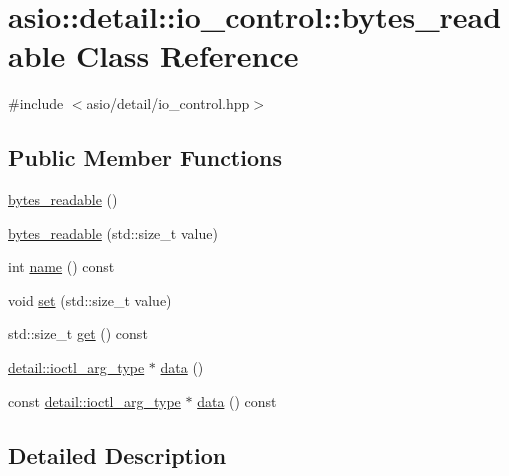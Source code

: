 \hypertarget{classasio_1_1detail_1_1io__control_1_1bytes__readable}{}\section{asio\+:\+:detail\+:\+:io\+\_\+control\+:\+:bytes\+\_\+readable Class Reference}
\label{classasio_1_1detail_1_1io__control_1_1bytes__readable}


{\ttfamily \#include $<$asio/detail/io\+\_\+control.\+hpp$>$}

\subsection*{Public Member Functions}
\begin{DoxyCompactItemize}
\item 
\hyperlink{classasio_1_1detail_1_1io__control_1_1bytes__readable_ab6570cf3dde553e8235764e7ddb3bedd}{bytes\+\_\+readable} ()
\item 
\hyperlink{classasio_1_1detail_1_1io__control_1_1bytes__readable_a2aef63faf74cd5450291c32f00def2e4}{bytes\+\_\+readable} (std\+::size\+\_\+t value)
\item 
int \hyperlink{classasio_1_1detail_1_1io__control_1_1bytes__readable_a20044117f07f99b67b0daa9c04aaf74b}{name} () const 
\item 
void \hyperlink{classasio_1_1detail_1_1io__control_1_1bytes__readable_a90fc57f95e23a2959eef843f9c20cd33}{set} (std\+::size\+\_\+t value)
\item 
std\+::size\+\_\+t \hyperlink{classasio_1_1detail_1_1io__control_1_1bytes__readable_aa6b38448b5daa5b6dd03f9c3c9a1cb08}{get} () const 
\item 
\hyperlink{namespaceasio_1_1detail_a27f72e1b8b785eaaa59ddc6b41751106}{detail\+::ioctl\+\_\+arg\+\_\+type} $\ast$ \hyperlink{classasio_1_1detail_1_1io__control_1_1bytes__readable_ab35b72f830ca3f63ea5b44a6b50c5325}{data} ()
\item 
const \hyperlink{namespaceasio_1_1detail_a27f72e1b8b785eaaa59ddc6b41751106}{detail\+::ioctl\+\_\+arg\+\_\+type} $\ast$ \hyperlink{classasio_1_1detail_1_1io__control_1_1bytes__readable_adfb8004c4b77f5f6e6e512531abf0f22}{data} () const 
\end{DoxyCompactItemize}


\subsection{Detailed Description}



